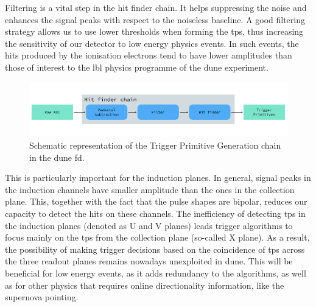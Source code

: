 Filtering is a vital step in the hit finder chain. It helps suppressing the noise and enhances the signal peaks with respect to the noiseless baseline. A good filtering strategy allows us to use lower thresholds when forming the \gls{tp}s, thus increasing the sensitivity of our detector to low energy physics events. In such events, the hits produced by the ionisation electrons tend to have lower amplitudes than those of interest to the \gls{lbl} physics programme of the \gls{dune} experiment.

\begin{figure}[t]
	\centering
	\includegraphics[width=0.99\linewidth]{Images/Matched_Filter/trigger_primitive_chain.pdf}
	\caption{Schematic representation of the Trigger Primitive Generation chain in the \gls{dune} \gls{fd}.}
	\label{fig:tpg_chain}
\end{figure}

This is particularly important for the induction planes. In general, signal peaks in the induction channels have smaller amplitude than the ones in the collection plane. This, together with the fact that the pulse shapes are bipolar, reduces our capacity to detect the hits on these channels. The inefficiency of detecting \gls{tp}s in the induction planes (denoted as U and V planes) leads trigger algorithms to focus mainly on the \gls{tp}s from the collection plane (so-called X plane). As a result, the possibility of making trigger decisions based on the coincidence of \gls{tp}s across the three readout planes remains nowadays unexploited in \gls{dune}. This will be beneficial for low energy events, as it adds redundancy to the algorithms, as well as for other physics that requires online directionality information, like the supernova pointing.

